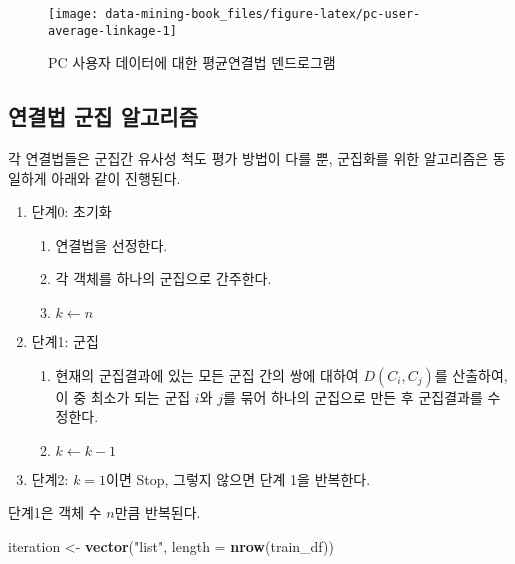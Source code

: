 \documentclass[]{book}
\newenvironment{Shaded}{\begin{snugshade}}{\end{snugshade}}
\newcommand{\DataTypeTok}[1]{\textcolor[rgb]{0.13,0.29,0.53}{#1}}
\newcommand{\KeywordTok}[1]{\textcolor[rgb]{0.13,0.29,0.53}{\textbf{#1}}}
\newcommand{\NormalTok}[1]{#1}
\newcommand{\StringTok}[1]{\textcolor[rgb]{0.31,0.60,0.02}{#1}}
\providecommand{\tightlist}{%
  \setlength{\itemsep}{0pt}\setlength{\parskip}{0pt}}
\begin{document}
\begin{figure}

{\centering \texttt{[image: data-mining-book\_files/figure-latex/pc-user-average-linkage-1]} 

}

\caption{PC 사용자 데이터에 대한 평균연결법 덴드로그램}\label{fig:pc-user-average-linkage}
\end{figure}

\hypertarget{linkage-method-algorithm}{%
\subsection{연결법 군집 알고리즘}\label{linkage-method-algorithm}}

각 연결법들은 군집간 유사성 척도 평가 방법이 다를 뿐, 군집화를 위한 알고리즘은 동일하게 아래와 같이 진행된다.

\begin{enumerate}
\def\labelenumi{\arabic{enumi}.}
\setcounter{enumi}{-1}
\tightlist
\item
  단계0: 초기화

  \begin{enumerate}
  \def\labelenumii{\arabic{enumii}.}
  \tightlist
  \item
    연결법을 선정한다.
  \item
    각 객체를 하나의 군집으로 간주한다.
  \item
    \(k \leftarrow n\)
  \end{enumerate}
\item
  단계1: 군집

  \begin{enumerate}
  \def\labelenumii{\arabic{enumii}.}
  \tightlist
  \item
    현재의 군집결과에 있는 모든 군집 간의 쌍에 대하여 \(D(C_i, C_j)\)를 산출하여, 이 중 최소가 되는 군집 \(i\)와 \(j\)를 묶어 하나의 군집으로 만든 후 군집결과를 수정한다.
  \item
    \(k \leftarrow k - 1\)
  \end{enumerate}
\item
  단계2: \(k = 1\)이면 Stop, 그렇지 않으면 단계 1을 반복한다.
\end{enumerate}

단계1은 객체 수 \(n\)만큼 반복된다.

\begin{Shaded}
\begin{Highlighting}[]
\NormalTok{iteration <-}\StringTok{ }\KeywordTok{vector}\NormalTok{(}\StringTok{"list"}\NormalTok{, }\DataTypeTok{length =} \KeywordTok{nrow}\NormalTok{(train_df))}
\end{Highlighting}
\end{Shaded}
\end{document}
